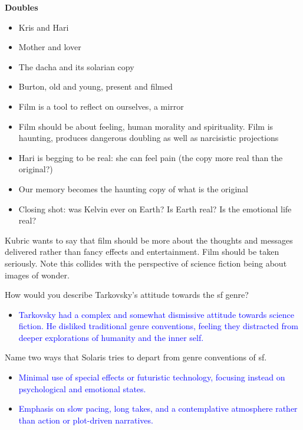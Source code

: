 \documentclass[11pt,fleqn]{book} %
\begin{document}
\textbf{Doubles}
\begin{itemize}
    \item Kris and Hari
    \item Mother and lover 
    \item The dacha and its solarian copy
    \item Burton, old and young, present and filmed
    \item Film is a tool to reflect on ourselves, a mirror
    \item Film should be about feeling, human morality and spirituality. Film is haunting, produces dangerous doubling as well as narcisistic projections
    \item Hari is begging to be real: she can feel pain (the copy more real than the original?)
    \item Our memory becomes the haunting copy of what is the original
    \item Closing shot: was Kelvin ever on Earth? Is Earth real? Is the emotional life real?
\end{itemize}
\begin{remark}
    Kubric wants to say that film should be more about the thoughts and messages delivered rather than fancy effects and entertainment. Film should be taken seriously. Note this collides with the perspective of science fiction being about images of wonder.
\end{remark}
\begin{exercise}
How would you describe Tarkovsky's attitude towards the sf genre?
\begin{itemize}
\item \textcolor{blue}{Tarkovsky had a complex and somewhat dismissive attitude towards science fiction. He disliked traditional genre conventions, feeling they distracted from  deeper explorations of humanity and the inner self.}
\end{itemize}
\end{exercise}

\begin{exercise}
Name two ways that Solaris tries to depart from genre conventions of sf.
\begin{itemize}
\item \textcolor{blue}{Minimal use of special effects or futuristic technology,  focusing instead on psychological and emotional states.}
\item \textcolor{blue}{Emphasis on slow pacing, long takes, and a contemplative atmosphere rather than action or plot-driven narratives.}
\end{itemize}
\end{exercise}
\end{document}
